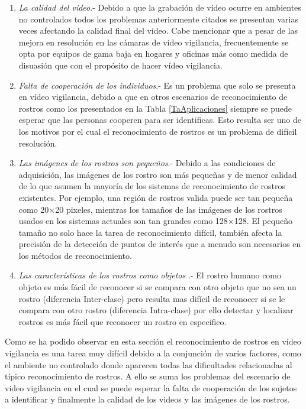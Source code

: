 \begin{enumerate}
\item \textit{La calidad del video}.- Debido a que la grabación de vídeo ocurre en ambientes no controlados todos los problemas anteriormente citados se presentan varias veces afectando la calidad final del vídeo. Cabe mencionar que a pesar de las mejora en resolución en las cámaras de vídeo vigilancia, frecuentemente se opta por equipos de gama baja en hogares y oficinas más como medida de disuasión que con el propósito de hacer vídeo vigilancia.
\item \textit{Falta de cooperación de los individuos}.- Es un problema que solo se presenta en vídeo vigilancia, debido a que en otros escenarios de reconocimiento de rostros como los presentados en la Tabla \ref{TaAplicaciones} siempre se puede esperar que las personas cooperen para ser identificas. Esto resulta ser uno de los motivos por el cual el reconocimiento de rostros es un problema de difícil resolución.
\item \textit{Las imágenes de los  rostros son pequeños}.- Debido a las condiciones de adquisición, las imágenes de los rostro son más pequeñas y de menor calidad de lo que asumen la mayoría de los sistemas de reconocimiento de rostros existentes. Por ejemplo, una región de rostros valida puede ser tan pequeña como 20$\times$20 pixeles, mientras los tamaños de las imágenes de los rostros usados en los sistemas actuales son tan grandes como 128$\times$128. El pequeño tamaño no solo hace la tarea de reconocimiento difícil, también afecta la precisión de la detección de puntos de interés que a menudo son necesarios en los métodos de reconocimiento.
\item \textit{Las características de los rostros como objetos} \cite{zhao2003face}.- El rostro humano como objeto es más fácil de reconocer si se compara con otro objeto que no sea un rostro (diferencia Inter-clase) pero resulta mas difícil de reconocer si se le compara con otro rostro (diferencia Intra-clase) por ello detectar y localizar rostros es más fácil que reconocer un rostro en especifico. 
\end{enumerate}

Como se ha podido observar en esta sección el reconocimiento de rostros en vídeo vigilancia es una tarea muy difícil debido a la conjunción de varios factores, como el ambiente no controlado donde aparecen todas las dificultades relacionadas al típico reconocimiento de rostros. A ello se suma los problemas del escenario de video vigilancia en el cual se puede esperar la falta de cooperación de los sujetos a identificar y finalmente la calidad de los videos y las imágenes de los rostros.


